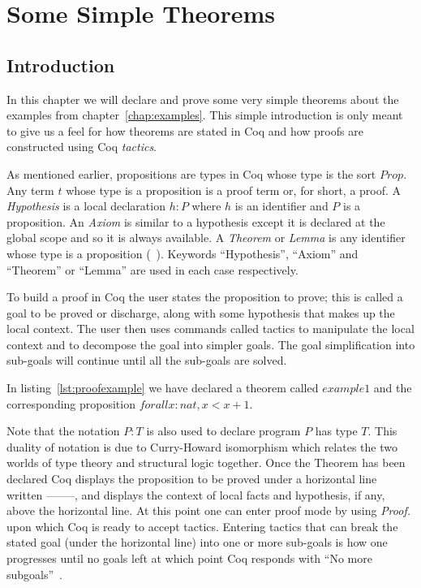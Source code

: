 \chapter{Some Simple Theorems}

\section{Introduction}

In this chapter we will declare and prove some very simple theorems about the examples from chapter~\ref{chap:examples}. This simple introduction is only meant to give us a feel for how theorems are stated in Coq and how proofs are constructed using Coq \emph{tactics}. 

As mentioned earlier, propositions are types in Coq whose type is the sort $Prop$. Any term $t$ whose type is a proposition is a proof term or, for short, a proof. A \emph{Hypothesis} is a local declaration $h : P$ where $h$ is an identifier and $P$ is a proposition. An \emph{Axiom} is similar to a hypothesis except it is declared at the global scope and so it is always available. A \emph{Theorem} or \emph{Lemma} is any identifier whose type is a proposition (~\cite{BC04}). Keywords ``Hypothesis'', ``Axiom'' and ``Theorem'' or ``Lemma'' are used in each case respectively. 

To build a proof in Coq the user states the proposition to prove; this is called a goal to be proved or discharge, along with some hypothesis that makes up the local context. The user then uses commands called tactics to manipulate the local context and to decompose the goal into simpler goals. The goal simplification into sub-goals will continue until all the sub-goals are solved.

In listing~\ref{lst:proofexample} we have declared a theorem called $example1$ and the corresponding proposition $forall x:nat, x < x + 1.$
 
Note that the notation $P : T$ is also used to declare program $P$ has type $T$. This duality of notation is due to Curry-Howard isomorphism which relates the two worlds of type theory and structural logic together. Once the Theorem has been declared Coq displays the proposition to be proved under a horizontal line written --------, and displays the context of local facts and hypothesis, if any, above the horizontal line. At this point one can enter proof mode by using \emph{Proof.} upon which Coq is ready to accept tactics. Entering tactics that can break the stated goal (under the horizontal line) into one or more sub-goals is how one progresses until no goals left at which point Coq responds with ``No more subgoals''~\cite{CoqHurry}.

